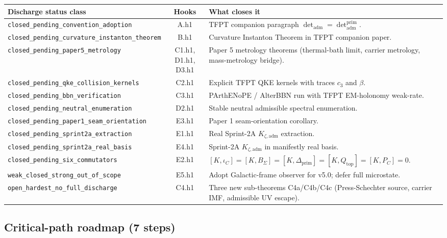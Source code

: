 \begin{center}
\renewcommand{\arraystretch}{1.13}
\begin{tabularx}{\textwidth}{@{}p{}cY@{}}
\toprule
\textbf{Discharge status class} & \textbf{Hooks} & \textbf{What closes it} \\
\midrule
\texttt{closed\_pending\_convention\_adoption}        & A.h1
& TFPT companion paragraph \(\det_{\mathrm{adm}}=\det_{\mathrm{adm}}^{\mathrm{prim}}\). \\
\texttt{closed\_pending\_curvature\_instanton\_theorem} & B.h1
& Curvature Instanton Theorem in TFPT companion paper. \\
\texttt{closed\_pending\_paper5\_metrology}            & C1.h1, D1.h1, D3.h1
& Paper 5 metrology theorems (thermal-bath limit, carrier metrology,
mass-metrology bridge). \\
\texttt{closed\_pending\_qke\_collision\_kernels}      & C2.h1
& Explicit TFPT QKE kernels with traces \(c_3\) and \(\beta\). \\
\texttt{closed\_pending\_bbn\_verification}            & C3.h1
& PArthENoPE / AlterBBN run with TFPT EM-holonomy weak-rate. \\
\texttt{closed\_pending\_neutral\_enumeration}         & D2.h1
& Stable neutral admissible spectral enumeration. \\
\texttt{closed\_pending\_paper1\_seam\_orientation}    & E3.h1
& Paper 1 seam-orientation corollary. \\
\texttt{closed\_pending\_sprint2a\_extraction}         & E1.h1
& Real Sprint-2A \(K_{\zeta,\mathrm{adm}}\) extraction. \\
\texttt{closed\_pending\_sprint2a\_real\_basis}        & E4.h1
& Sprint-2A \(K_{\zeta,\mathrm{adm}}\) in manifestly real basis. \\
\texttt{closed\_pending\_six\_commutators}             & E2.h1
& \([K,\iota_C]=[K,B_\Sigma]=[K,\Delta_{\mathrm{prim}}]
=[K,Q_{\mathrm{top}}]=[K,P_C]=0\). \\
\texttt{weak\_closed\_strong\_out\_of\_scope}          & E5.h1
& Adopt Galactic-frame observer for v5.0; defer full microstate. \\
\texttt{open\_hardest\_no\_full\_discharge}            & C4.h1
& Three new sub-theorems C4a/C4b/C4c (Press-Schechter source,
carrier IMF, admissible UV escape). \\
\bottomrule
\end{tabularx}
\end{center}

\subsection{Critical-path roadmap (7 steps)}

